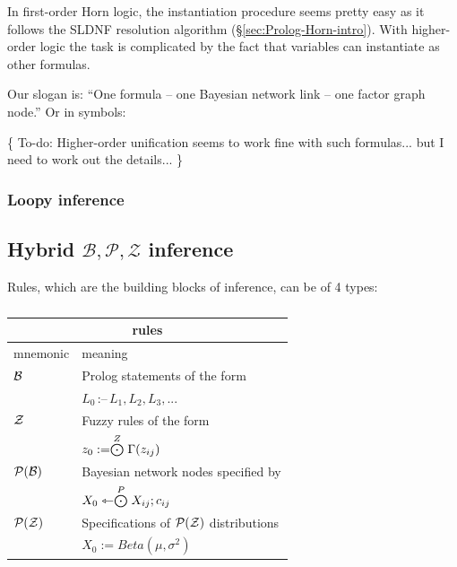 In first-order Horn logic, the instantiation procedure seems pretty easy as it follows the SLDNF resolution algorithm (\S\ref{sec:Prolog-Horn-intro}).  With higher-order logic the task is complicated by the fact that variables can instantiate as other formulas.

Our slogan is:  ``One formula -- one Bayesian network link -- one factor graph node.''  Or in symbols:

\vspace{0.1cm} \tab \tab
{}

\{ To-do:  Higher-order unification seems to work fine with such formulas... but I need to work out the details...  \}

\underconst

\subsubsection{Loopy inference}

\underconst

\subsection{Hybrid $\mathcal{B,P,Z}$ inference}

Rules, which are the building blocks of inference, can be of 4 types:

\begin{table}[H]
\parbox{3cm}{\caption{}}
\begin{tabular}{|l|l|} \hline
\multicolumn{2}{|c|}{\textbf{rules}}\\ \hline
mnemonic             & meaning\\ \hline
$\mathcal{B}$              & Prolog statements of the form\\
                     & \qquad $L_0 \, \mbox{:--} \, L_1, L_2, L_3, ... $ \\
$\mathcal{Z}$              & Fuzzy rules of the form\\
                     & \qquad $z_0 := \stackrel{Z}{\bigodot} \Gamma(z_{ij})$ \\
$\mathcal{P(B)}$             & Bayesian network nodes specified by\\
                     & \qquad $X_0 \leftarrowtriangle \stackrel{P}{\bigodot} X_{ij};c_{ij}$ \\
$\mathcal{P(Z)}$             & Specifications of $\mathcal{P(Z)}$ distributions\\
                     & \qquad $X_0 := Beta(\mu,\sigma^2)$ \\
\hline
\end{tabular}
\end{table}


